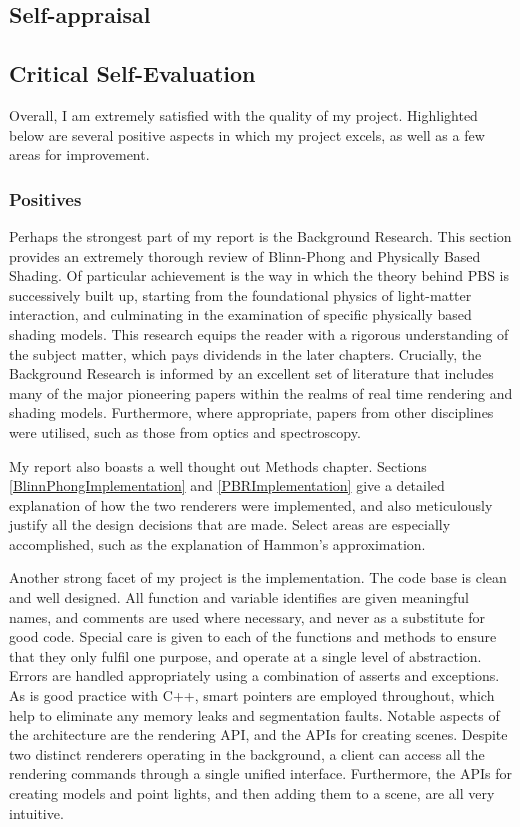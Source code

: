 \begin{appendices}

%
%
\chapter{Self-appraisal}

\section{Critical Self-Evaluation}

Overall, I am extremely satisfied with the quality of my project. Highlighted below are several positive aspects in which my project excels, as well as a few areas for improvement.

\subsection{Positives}

Perhaps the strongest part of my report is the Background Research. This section provides an extremely thorough review of Blinn-Phong and Physically Based Shading. Of particular achievement is the way in which the theory behind PBS is successively built up, starting from the foundational physics of light-matter interaction, and culminating in the examination of specific physically based shading models. This research equips the reader with a rigorous understanding of the subject matter, which pays dividends in the later chapters. Crucially, the Background Research is informed by an excellent set of literature that includes many of the major pioneering papers within the realms of real time rendering and shading models. Furthermore, where appropriate, papers from other disciplines were utilised, such as those from optics and spectroscopy.

My report also boasts a well thought out Methods chapter. Sections \ref{BlinnPhongImplementation} and \ref{PBRImplementation} give a detailed explanation of how the two renderers were implemented, and also meticulously justify all the design decisions that are made. Select areas are especially accomplished, such as the explanation of Hammon's approximation.

Another strong facet of my project is the implementation. The code base is clean and well designed. All function and variable identifies are given meaningful names, and comments are used where necessary, and never as a substitute for good code. Special care is given to each of the functions and methods to ensure that they only fulfil one purpose, and operate at a single level of abstraction. Errors are handled appropriately using a combination of asserts and exceptions. As is good practice with C++, smart pointers are employed throughout, which help to eliminate any memory leaks and segmentation faults. Notable aspects of the architecture are the rendering API, and the APIs for creating scenes. Despite two distinct renderers operating in the background, a client can access all the rendering commands through a single unified interface. Furthermore, the APIs for creating models and point lights, and then adding them to a scene, are all very intuitive.


\end{appendices}
